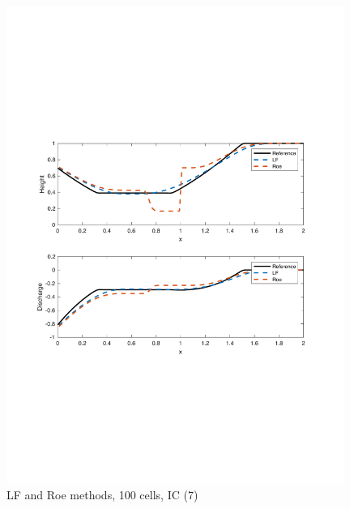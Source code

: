 \documentclass[11pt,a4paper]{article}
\begin{document}
\begin{figure}[!htb]
    \centering
    \includegraphics[width=11cm]{pictures/IC_4_100_cells.pdf}
    \caption{LF and Roe methods, 100 cells, IC (7)}
    \label{fig:IC_4_100_cells}
\end{figure}
\end{document}
